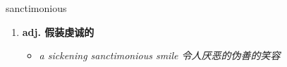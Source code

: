 
\begin{frame}
{\huge sanctimonious}
\begin{center}
\begin{enumerate}\Large
  \item \textbf{adj. 假装虔诚的}
  \begin{itemize}
    \item \em{\Large{a sickening sanctimonious smile 令人厌恶的伪善的笑容}}
  \end{itemize}
\end{enumerate}
\end{center}
\end{frame}
